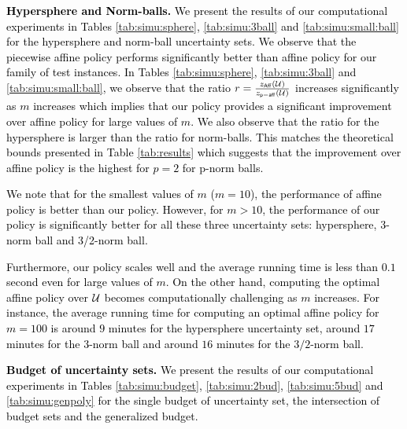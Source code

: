 \documentclass[11pt]{article}
\theoremstyle{plain}
\theoremstyle{definition}
\numberwithin{equation}{section}%
\numberwithin{equation}{section}%
\newcommand{\mb}[1]{\ensuremath{\boldsymbol{#1}}}
\newcommand*{\red}{\textcolor{black}}
\begin{document}


 \vspace{2mm}
 \noindent
 \red{
{\bf Hypersphere and Norm-balls.}
We present the results of our computational experiments in Tables \ref{tab:simu:sphere}, \ref{tab:simu:3ball} and \ref{tab:simu:small:ball} for the hypersphere and norm-ball uncertainty sets. We observe that the piecewise affine policy performs significantly better than affine policy for our family of test instances. In Tables \ref{tab:simu:sphere}, \ref{tab:simu:3ball} and \ref{tab:simu:small:ball}, we observe that the ratio  $r= \frac{z_{\sf{Aff}} ({\cal U})    }{z_{\sf{p-aff}}  ({\cal U})         }$  increases significantly as $m$ increases which implies that our policy provides a significant improvement over affine policy for large values of $m$. We also observe that the ratio for the hypersphere is larger than the ratio for norm-balls. This matches the theoretical bounds presented in Table \ref{tab:results} which suggests that the improvement over affine policy is the highest for $p=2$ for p-norm balls. }

\red{
We note that for the smallest values of $m$ ($m =10$), the performance of affine policy is better than our policy.  However, for $m > 10$, the performance of our policy is significantly better for all these three uncertainty sets: hypersphere, 3-norm ball and 3/2-norm ball.}

\red{
Furthermore, our policy scales  well and the average running time is less than $0.1$ second even for large values of $m$. On the other hand, computing the optimal affine policy over ${\cal U}$ becomes computationally challenging as $m$ increases. For instance, the average running time for computing an optimal affine policy for $m=100$ is around $9$ minutes for the hypersphere uncertainty set, around $17$ minutes for the $3$-norm ball and around $16$ minutes for the $3/2$-norm ball. }

\vspace{2mm}
\noindent
\red{ {\bf Budget of uncertainty sets.}
We present the results of our computational experiments in Tables \ref{tab:simu:budget}, \ref{tab:simu:2bud}, \ref{tab:simu:5bud} and \ref{tab:simu:genpoly} for the single budget of uncertainty set, the intersection of budget sets and the generalized budget.}
\end{document}
